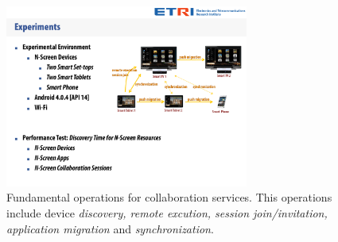 \documentclass[conference]{IEEEtran}
\begin{document}
 \begin{figure}[htb] %
 \centering
 \includegraphics[width=8cm,keepaspectratio]{concepts}
 \caption{Fundamental operations for collaboration services. This operations include device \textit{discovery, remote excution, session join/invitation, application migration} and  \textit{synchronization}.}
 \label{fig:operations}
 \end{figure}
\end{document}
